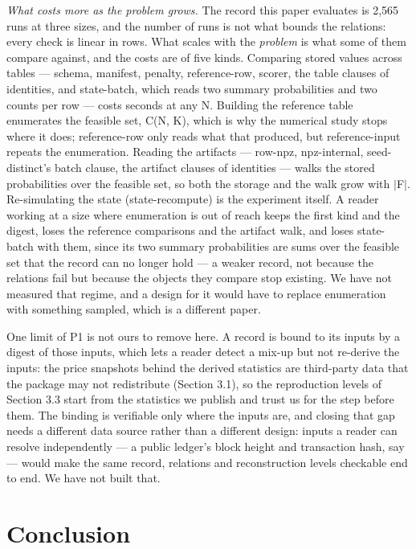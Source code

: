 \documentclass[acmsmall,screen,review]{acmart}
\begin{document}
\textit{What costs more as the problem grows.} The record this paper evaluates is 2,565 runs at three sizes, and the number of runs is not what bounds the relations: every check is linear in rows. What scales with the \textit{problem} is what some of them compare against, and the costs are of five kinds. Comparing stored values across tables --- schema, manifest, penalty, reference-row, scorer, the table clauses of identities, and state-batch, which reads two summary probabilities and two counts per row --- costs seconds at any N. Building the reference table enumerates the feasible set, C(N, K), which is why the numerical study stops where it does; reference-row only reads what that produced, but reference-input repeats the enumeration. Reading the artifacts --- row-npz, npz-internal, seed-distinct's batch clause, the artifact clauses of identities --- walks the stored probabilities over the feasible set, so both the storage and the walk grow with $|$F$|$. Re-simulating the state (state-recompute) is the experiment itself. A reader working at a size where enumeration is out of reach keeps the first kind and the digest, loses the reference comparisons and the artifact walk, and loses state-batch with them, since its two summary probabilities are sums over the feasible set that the record can no longer hold --- a weaker record, not because the relations fail but because the objects they compare stop existing. We have not measured that regime, and a design for it would have to replace enumeration with something sampled, which is a different paper.


One limit of P1 is not ours to remove here. A record is bound to its inputs by a digest of those inputs, which lets a reader detect a mix-up but not re-derive the inputs: the price snapshots behind the derived statistics are third-party data that the package may not redistribute (Section 3.1), so the reproduction levels of Section 3.3 start from the statistics we publish and trust us for the step before them. The binding is verifiable only where the inputs are, and closing that gap needs a different data source rather than a different design: inputs a reader can resolve independently --- a public ledger's block height and transaction hash, say --- would make the same record, relations and reconstruction levels checkable end to end. We have not built that.


\section{Conclusion}
\end{document}
